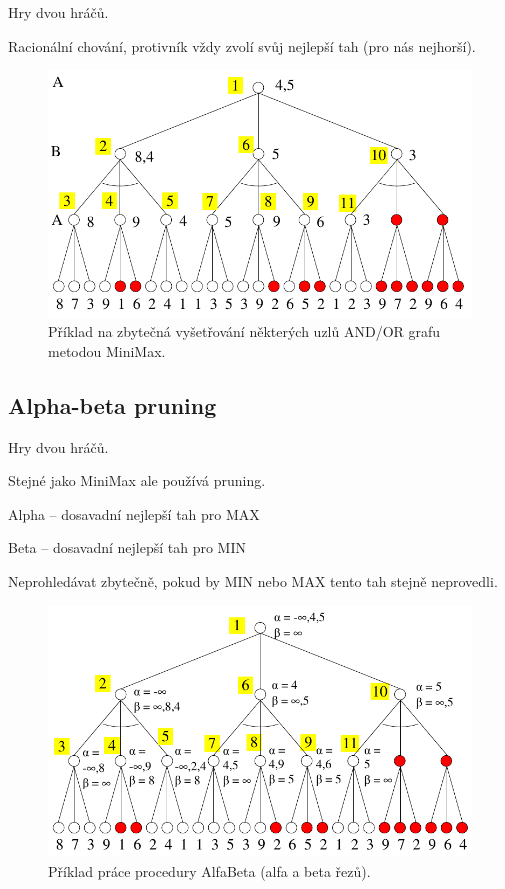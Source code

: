 \begin{compactitem}
    \item Hry dvou hráčů.
    \item Racionální chování, protivník vždy zvolí svůj nejlepší tah (pro nás nejhorší).

    \begin{figure}[H]
        \centering
        \includegraphics[width=1\linewidth]{mini_max.pdf}
        \caption{Příklad na zbytečná vyšetřování některých uzlů AND/OR grafu metodou MiniMax.}
    \end{figure}
\end{compactitem}

\subsection{Alpha-beta pruning}

\begin{compactitem}
    \item Hry dvou hráčů.
    \item Stejné jako MiniMax ale používá pruning.
    \item Alpha -- dosavadní nejlepší tah pro MAX
    \item Beta -- dosavadní nejlepší tah pro MIN
    \item Neprohledávat zbytečně, pokud by MIN nebo MAX tento tah stejně neprovedli.

    \begin{figure}[H]
        \centering
        \includegraphics[width=1\linewidth]{alpha_beta.pdf}
        \caption{Příklad práce procedury AlfaBeta (alfa a beta řezů).}
    \end{figure}
\end{compactitem}

